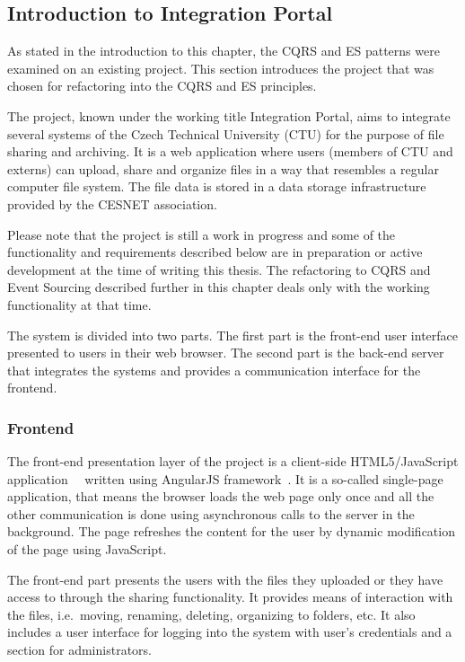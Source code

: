 \documentclass{book}
\begin{document}
\subsection{Introduction to Integration
Portal}\label{introduction-to-integration-portal}

As stated in the introduction to this chapter, the CQRS and ES patterns
were examined on an existing project. This section introduces the
project that was chosen for refactoring into the CQRS and ES principles.

The project, known under the working title Integration Portal, aims to
integrate several systems of the Czech Technical University (CTU) for
the purpose of file sharing and archiving. It is a web application where
users (members of CTU and externs) can upload, share and organize files
in a way that resembles a regular computer file system. The file data is
stored in a data storage infrastructure provided by the CESNET
association.

Please note that the project is still a work in progress and some of the
functionality and requirements described below are in preparation or
active development at the time of writing this thesis. The refactoring
to CQRS and Event Sourcing described further in this chapter deals only
with the working functionality at that time.

The system is divided into two parts. The first part is the front-end
user interface presented to users in their web browser. The second part
is the back-end server that integrates the systems and provides a
communication interface for the frontend.

\subsubsection{Frontend}\label{frontend}

The front-end presentation layer of the project is a client-side
HTML5/JavaScript application~\cite{frontend}~\cite{frontend2} written using AngularJS
framework~\cite{angular}. It is a so-called single-page application,
that means the browser loads the web page only once and all the other
communication is done using asynchronous calls to the server in the
background. The page refreshes the content for the user by dynamic
modification of the page using JavaScript.

The front-end part presents the users with the files they uploaded or
they have access to through the sharing functionality. It provides means
of interaction with the files, i.e.~moving, renaming, deleting,
organizing to folders, etc. It also includes a user interface for
logging into the system with user's credentials and a section for
administrators.
\end{document}
